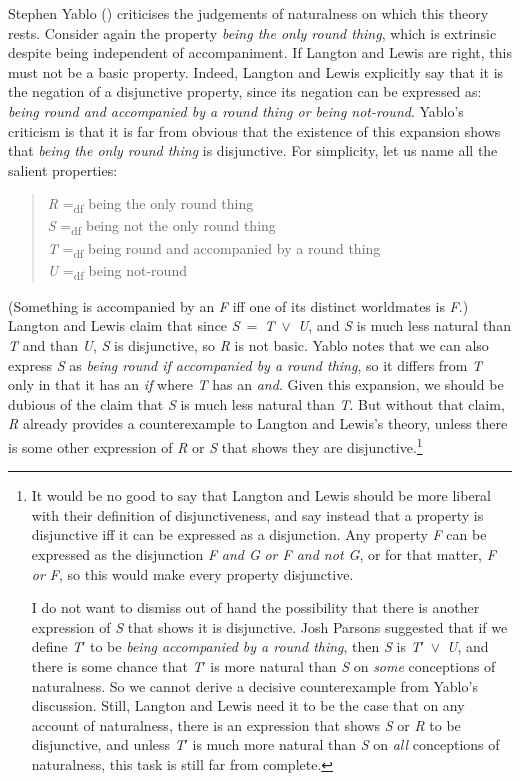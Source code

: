 \documentclass[
  10pt,
  letterpaper,
  DIV=11,
  numbers=noendperiod,
  twoside]{scrartcl}
\begin{document}
Stephen Yablo () criticises the
judgements of naturalness on which this theory rests. Consider again the
property \emph{being the only round thing}, which is extrinsic despite
being independent of accompaniment. If Langton and Lewis are right, this
must not be a basic property. Indeed, Langton and Lewis explicitly say
that it is the negation of a disjunctive property, since its negation
can be expressed as: \emph{being round and accompanied by a round thing
or being not-round}. Yablo's criticism is that it is far from obvious
that the existence of this expansion shows that \emph{being the only
round thing} is disjunctive. For simplicity, let us name all the salient
properties:

\begin{quote}
\emph{R} =\textsubscript{df} being the only round thing\\
\emph{S} =\textsubscript{df} being not the only round thing\\
\emph{T} =\textsubscript{df} being round and accompanied by a round
thing\\
\emph{U} =\textsubscript{df} being not-round
\end{quote}

(Something is accompanied by an \emph{F} iff one of its distinct
worldmates is \emph{F}.) Langton and Lewis claim that since
\emph{S}~=~\emph{T}~\({\vee}\)~\emph{U}, and \emph{S} is much less
natural than \emph{T} and than \emph{U}, \emph{S} is disjunctive, so
\emph{R} is not basic. Yablo notes that we can also express \emph{S} as
\emph{being round if accompanied by a round thing}, so it differs from
\emph{T} only in that it has an \emph{if} where \emph{T} has an
\emph{and}. Given this expansion, we should be dubious of the claim that
\emph{S} is much less natural than \emph{T}. But without that claim,
\emph{R} already provides a counterexample to Langton and Lewis's
theory, unless there is some other expression of \emph{R} or \emph{S}
that shows they are disjunctive.\footnote{It would be no good to say
  that Langton and Lewis should be more liberal with their definition of
  disjunctiveness, and say instead that a property is disjunctive iff it
  can be expressed as a disjunction. Any property \emph{F} can be
  expressed as the disjunction \emph{F} \emph{and G} \emph{or F and not
  G}, or for that matter, \emph{F or F}, so this would make every
  property disjunctive.

  I do not want to dismiss out of hand the possibility that there is
  another expression of \emph{S} that shows it is disjunctive. Josh
  Parsons suggested that if we define \emph{T}′ to be \emph{being
  accompanied by a round thing}, then \emph{S} is
  \emph{T}′~\({\vee}\)~\emph{U}, and there is some chance that \emph{T}′
  is more natural than \emph{S} on \emph{some} conceptions of
  naturalness. So we cannot derive a decisive counterexample from
  Yablo's discussion. Still, Langton and Lewis need it to be the case
  that on any account of naturalness, there is an expression that shows
  \emph{S} or \emph{R} to be disjunctive, and unless \emph{T}′ is much
  more natural than \emph{S} on \emph{all} conceptions of naturalness,
  this task is still far from complete.}
\end{document}
